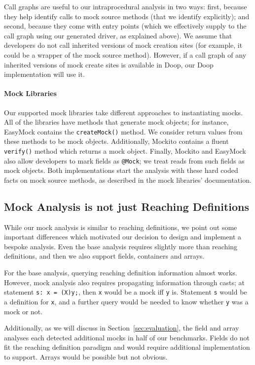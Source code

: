Call graphs are useful to our intraprocedural analysis in two ways: first, because they help identify calls to mock source methods (that we identify explicitly); and second, because they come with entry points (which we effectively supply to the call graph using our generated driver, as explained above). We assume that developers do not call inherited versions of mock creation sites (for example, it could be a wrapper of the mock source method). However, if a call graph of any inherited versions of mock create sites is available in Doop, our Doop implementation will use it. 

\paragraph{Mock Libraries}
Our supported mock libraries take different approaches to instantiating mocks. All of the libraries have methods that generate mock objects; for instance, EasyMock contains the \texttt{createMock()} method. We consider return values from these methods to be mock objects. Additionally, Mockito contains a fluent \texttt{verify()} method which returns a mock object. Finally, Mockito and EasyMock also allow developers to mark fields as \texttt{@Mock}; we treat reads from such fields as mock objects. Both implementations start the analysis with these hard coded facts on mock source methods, as described in the mock libraries' documentation.

\subsection{Mock Analysis is not just Reaching Definitions}
While our mock analysis is similar to reaching definitions, we point out some important differences which motivated our decision to design and implement a bespoke analysis. Even the base analysis requires slightly more than reaching definitions, and then we also support fields, containers and arrays.

For the base analysis, querying reaching definition information almost works. However, mock analysis also requires propagating information through casts; at statement {\tt s: x = (X)y;}, then {\tt x} would be a mock iff {\tt y} is. Statement {\tt s} would be a definition for {\tt x}, and a further query would be needed to know whether {\tt y} was a mock or not.

Additionally, as we will discuss in Section~\ref{sec:evaluation}, the field and array analyses each detected additional mocks in half of our benchmarks. Fields do not fit the reaching definition paradigm and would require additional implementation to support. Arrays would be possible but not obvious.


